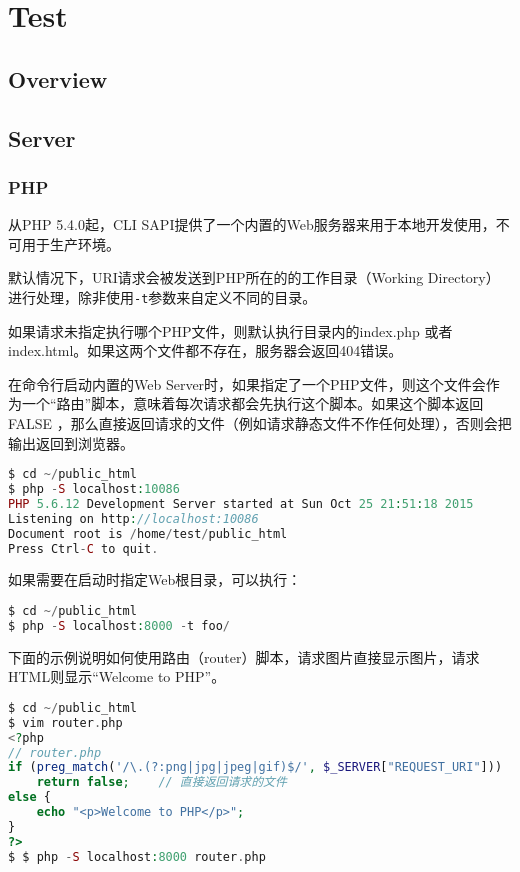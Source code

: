 \part{Test}


\chapter{Overview}





\chapter{Server}




\section{PHP}


从PHP 5.4.0起，CLI SAPI提供了一个内置的Web服务器来用于本地开发使用，不可用于生产环境。

默认情况下，URI请求会被发送到PHP所在的的工作目录（Working Directory）进行处理，除非使用\texttt{-t}参数来自定义不同的目录。

如果请求未指定执行哪个PHP文件，则默认执行目录内的index.php 或者 index.html。如果这两个文件都不存在，服务器会返回404错误。


在命令行启动内置的Web Server时，如果指定了一个PHP文件，则这个文件会作为一个“路由”脚本，意味着每次请求都会先执行这个脚本。如果这个脚本返回 FALSE ，那么直接返回请求的文件（例如请求静态文件不作任何处理），否则会把输出返回到浏览器。

\begin{lstlisting}[language=PHP]
$ cd ~/public_html
$ php -S localhost:10086
PHP 5.6.12 Development Server started at Sun Oct 25 21:51:18 2015
Listening on http://localhost:10086
Document root is /home/test/public_html
Press Ctrl-C to quit.
\end{lstlisting}


如果需要在启动时指定Web根目录，可以执行：

\begin{lstlisting}[language=PHP]
$ cd ~/public_html
$ php -S localhost:8000 -t foo/
\end{lstlisting}


下面的示例说明如何使用路由（router）脚本，请求图片直接显示图片，请求HTML则显示“Welcome to PHP”。

\begin{lstlisting}[language=PHP]
$ cd ~/public_html
$ vim router.php
<?php
// router.php
if (preg_match('/\.(?:png|jpg|jpeg|gif)$/', $_SERVER["REQUEST_URI"]))
    return false;    // 直接返回请求的文件
else { 
    echo "<p>Welcome to PHP</p>";
}
?>
$ $ php -S localhost:8000 router.php
\end{lstlisting}

